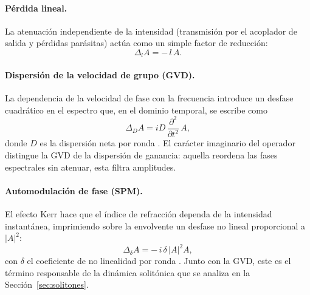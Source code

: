 \paragraph{Pérdida lineal.}
La atenuación independiente de la intensidad (transmisión por el acoplador de
salida y pérdidas parásitas) actúa como un simple factor de reducción:
%
\begin{equation}
    \Delta_{l} A = -\,l\,A .
    \label{eq:op_perdida}
\end{equation}

\paragraph{Dispersión de la velocidad de grupo (GVD).}
La dependencia de la velocidad de fase con la frecuencia introduce un desfase
cuadrático en el espectro que, en el dominio temporal, se escribe como
%
\begin{equation}
    \Delta_{D} A = i D\,\frac{\partial^2}{\partial t^2}\,A,
    \label{eq:op_gvd}
\end{equation}
%
donde $D$ es la dispersión neta por ronda \cite[ec.~6.116]{Keller2022}. El carácter imaginario del operador
distingue la GVD de la dispersión de ganancia: aquella reordena las fases
espectrales sin atenuar, esta filtra amplitudes.

\paragraph{Automodulación de fase (SPM).}
El efecto Kerr hace que el índice de refracción dependa de la intensidad
instantánea, imprimiendo sobre la envolvente un desfase no lineal proporcional a
$|A|^2$:
%
\begin{equation}
    \Delta_{\delta} A = -\,i\,\delta\,|A|^2 A,
    \label{eq:op_spm}
\end{equation}
%
con $\delta$ el coeficiente de no linealidad por ronda \cite[ec.~6.115]{Keller2022}. Junto con la GVD, este es
el término responsable de la dinámica solitónica que se analiza en la
Sección~\ref{sec:solitones}.

